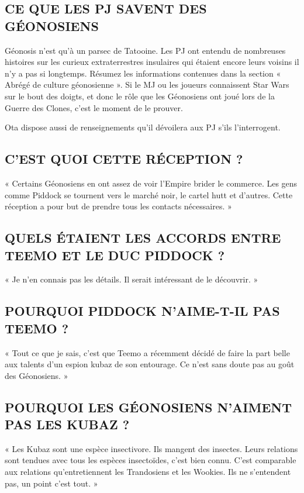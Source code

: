 \documentclass[a4paper,10pt,twoside,twocolumn,openany]{book}
\begin{document}
\subsection{CE QUE LES PJ SAVENT DES GÉONOSIENS}
Géonosis n’est qu’à un parsec de Tatooine. Les PJ ont
entendu de nombreuses histoires sur les curieux extraterrestres insulaires qui étaient encore leurs voisins il n’y a pas si longtemps. Résumez les informations contenues dans la section « Abrégé de culture géonosienne ». Si le MJ ou les joueurs connaissent Star Wars sur le
bout des doigts, et donc le rôle que les Géonosiens ont
joué lors de la Guerre des Clones, c’est le moment de
le prouver.

Ota dispose aussi de renseignements qu’il dévoilera
aux PJ s’ils l’interrogent.

\subsection{C’EST QUOI CETTE RÉCEPTION ?}
« Certains Géonosiens en ont assez de voir l’Empire brider
le commerce. Les gens comme Piddock se tournent vers
le marché noir, le cartel hutt et d’autres. Cette réception
a pour but de prendre tous les contacts nécessaires. »

\subsection{QUELS ÉTAIENT LES ACCORDS ENTRE TEEMO ET
LE DUC PIDDOCK ?}
« Je n’en connais pas les détails. Il serait intéressant de
le découvrir. »

\subsection{POURQUOI PIDDOCK N’AIME-T-IL PAS TEEMO ?}
« Tout ce que je sais, c’est que Teemo a récemment décidé de faire la part belle aux talents d’un espion kubaz
de son entourage. Ce n’est sans doute pas au goût des
Géonosiens. »

\subsection{POURQUOI LES GÉONOSIENS N’AIMENT PAS
LES KUBAZ ?}
« Les Kubaz sont une espèce insectivore. Ils mangent
des insectes. Leurs relations sont tendues avec tous les
espèces insectoïdes, c’est bien connu. C’est comparable
aux relations qu’entretiennent les Trandosiens et les
Wookies. Ils ne s’entendent pas, un point c’est tout. »
\end{document}
